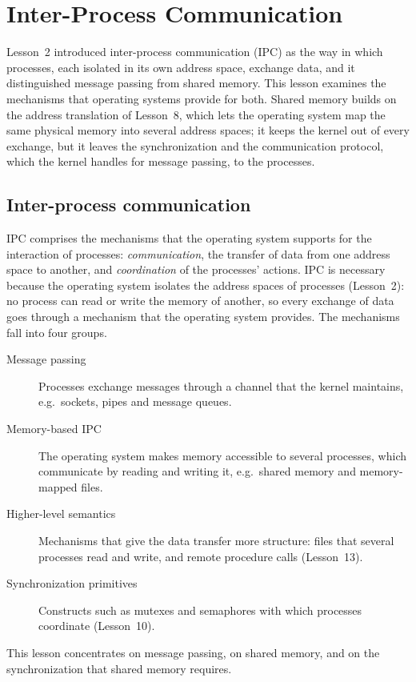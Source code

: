 \documentclass[../main.tex]{subfiles}
\begin{document}
\chapter{Inter-Process Communication}

Lesson~2 introduced inter-process communication (IPC) as the way in which
processes, each isolated in its own address space, exchange data, and it
distinguished message passing from shared memory.  This lesson examines the
mechanisms that operating systems provide for both.  Shared memory builds on
the address translation of Lesson~8, which lets the operating system map the
same physical memory into several address spaces; it keeps the kernel out of
every exchange, but it leaves the synchronization and the communication
protocol, which the kernel handles for message passing, to the processes.

\section{Inter-process communication}
\label{sec:l09-ipc}

IPC comprises the mechanisms that the operating system supports for the
interaction of processes: \emph{communication}, the transfer of data from
one address space to another, and \emph{coordination} of the processes'
actions.  IPC is necessary because the
operating system isolates the address spaces of processes (Lesson~2): no
process can read or write the memory of another, so every exchange of data
goes through a mechanism that the operating system provides.  The
mechanisms fall into four groups.
\begin{description}
  \item[Message passing] Processes exchange messages through a channel that
    the kernel maintains, e.g.\ sockets, pipes and message queues.
  \item[Memory-based IPC] The operating system makes memory accessible to
    several processes, which communicate by reading and writing it, e.g.\
    shared memory and memory-mapped files.
  \item[Higher-level semantics] Mechanisms that give the data transfer more
    structure: files that several processes read and write, and remote
    procedure calls (Lesson~13).
  \item[Synchronization primitives] Constructs such as mutexes and
    semaphores with which processes coordinate (Lesson~10).
\end{description}
This lesson concentrates on message passing, on shared memory, and on the
synchronization that shared memory requires.
\end{document}
